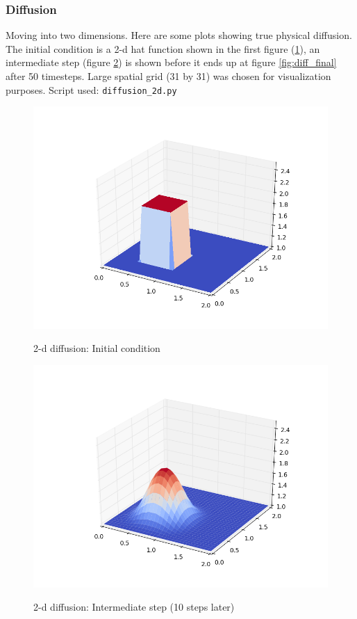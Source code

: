 \documentclass[11pt]{article}
\begin{document}
{\subsubsection{Diffusion}
Moving into two dimensions. Here are some plots showing true physical diffusion.
The initial condition is a 2-d hat function shown in the first figure (\ref{fig:diff_0}),
an intermediate step (figure \ref{fig:diff_1}) is shown before it ends up at figure
\ref{fig:diff_final} after 50 timesteps. Large spatial grid (31 by 31) was chosen
for visualization purposes. Script used: \texttt{diffusion\_2d.py}

	\begin{figure}[H]
	\centering
	\caption{2-d diffusion: Initial condition}
	\includegraphics[scale=0.6]{diff_0.png}
	\label{fig:diff_0}
	\end{figure}

	\begin{figure}[H]
	\centering
	\caption{2-d diffusion: Intermediate step (10 steps later)}
	\includegraphics[scale=0.6]{diff_1.png}
	\label{fig:diff_1}
	\end{figure}
	
}
\end{document}
